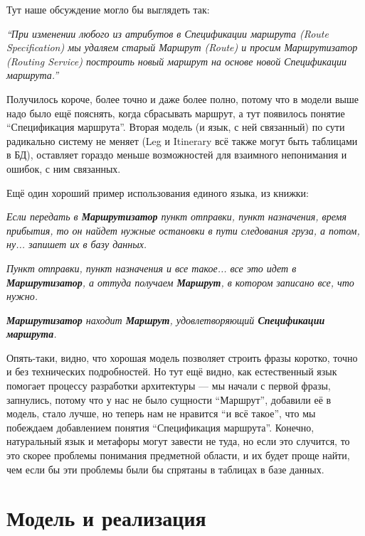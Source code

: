 \documentclass[a5paper]{article}
\begin{document}
Тут наше обсуждение могло бы выглядеть так:

\textit{``При изменении любого из атрибутов в Спецификации маршрута (Route Specification) мы удаляем старый Маршрут (Route) и просим Маршрутизатор (Routing Service) построить новый маршрут на основе новой Спецификации маршрута.''}

Получилось короче, более точно и даже более полно, потому что в модели выше надо было ещё пояснять, когда сбрасывать маршрут, а тут появилось понятие ``Спецификация маршрута''. Вторая модель (и язык, с ней связанный) по сути радикально систему не меняет (Leg и Itinerary всё также могут быть таблицами в БД), оставляет гораздо меньше возможностей для взаимного непонимания и ошибок, с ним связанных.

Ещё один хороший пример использования единого языка, из книжки:

\begin{center}
    \textit{Если передать в \textbf{Маршрутизатор} пункт отправки, пункт назначения, время прибытия, то он найдет нужные остановки в пути следования груза, а потом, ну... запишет их в базу данных.}

    \vspace{4mm}

    \textit{Пункт отправки, пункт назначения и все такое... все это идет в \textbf{Маршрутизатор}, а оттуда получаем \textbf{Маршрут}, в котором записано все, что нужно.}

    \vspace{4mm}

    \textit{\textbf{Маршрутизатор} находит \textbf{Маршрут}, удовлетворяющий \textbf{Спецификации маршрута}.}
\end{center}

Опять-таки, видно, что хорошая модель позволяет строить фразы коротко, точно и без технических подробностей. Но тут ещё видно, как естественный язык помогает процессу разработки архитектуры --- мы начали с первой фразы, запнулись, потому что у нас не было сущности ``Маршрут'', добавили её в модель, стало лучше, но теперь нам не нравится ``и всё такое'', что мы побеждаем добавлением понятия ``Спецификация маршрута''. Конечно, натуральный язык и метафоры могут завести не туда, но если это случится, то это скорее проблемы понимания предметной области, и их будет проще найти, чем если бы эти проблемы были бы спрятаны в таблицах в базе данных.

\section{Модель и реализация}
\end{document}

